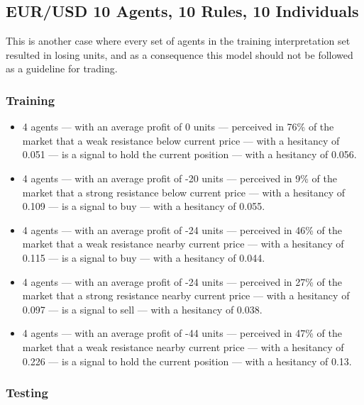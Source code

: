 \subsection{EUR/USD 10 Agents, 10 Rules, 10 Individuals}
\label{results:interpretation-eur-usd-10agents-10rules-10individuals}

This is another case where every set of agents in the training interpretation
set resulted in losing units, and as a consequence this model should not be
followed as a guideline for trading.

\subsubsection{Training}

{\small
  \begin{itemize}
  \item 4 agents — with an average profit of 0 units — perceived in 76\% of the
    market that a weak resistance below current price — with a hesitancy of
    0.051 — is a signal to hold the current position — with a hesitancy of
    0.056.
  \item 4 agents — with an average profit of -20 units — perceived in 9\% of the
    market that a strong resistance below current price — with a hesitancy of
    0.109 — is a signal to buy — with a hesitancy of 0.055.
  \item 4 agents — with an average profit of -24 units — perceived in 46\% of
    the market that a weak resistance nearby current price — with a hesitancy of
    0.115 — is a signal to buy — with a hesitancy of 0.044.
  \item 4 agents — with an average profit of -24 units — perceived in 27\% of
    the market that a strong resistance nearby current price — with a hesitancy
    of 0.097 — is a signal to sell — with a hesitancy of 0.038.
  \item 4 agents — with an average profit of -44 units — perceived in 47\% of
    the market that a weak resistance nearby current price — with a hesitancy of
    0.226 — is a signal to hold the current position — with a hesitancy of 0.13.
  \end{itemize}
}

\subsubsection{Testing}

